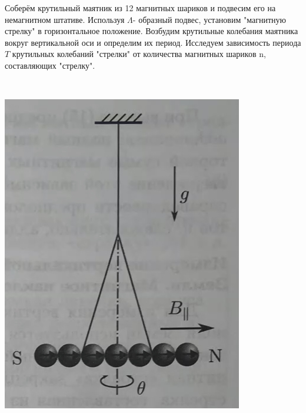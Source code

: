 \begin{minipage}{0.45\textwidth}
Соберём крутильный маятник из 12 магнитных шариков и подвесим его на немагнитном штативе. Используя $\Lambda$- образный подвес, установим "магнитную стрелку" в горизонтальное положение.
Возбудим крутильные колебания маятника вокруг вертикальной оси и определим их период. Исследуем зависимость периода $T$ крутильных колебаний "стрелки" от количества магнитных шариков n, составляющих "стрелку". 
\end{minipage}
\begin{minipage}{0.1\textwidth}
\
\end{minipage}
\begin{minipage}{0.45\textwidth}
\begin{center}
\includegraphics[width=0.7\linewidth]{3.jpg}\\
\end{center}
\end{minipage}

\\

